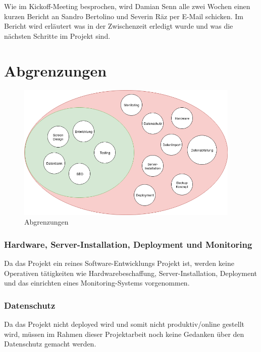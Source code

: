 Wie im Kickoff-Meeting besprochen, wird Damian Senn alle zwei Wochen einen
kurzen Bericht an Sandro Bertolino und Severin Räz per E-Mail schicken.
Im Bericht wird erläutert was in der Zwischenzeit erledigt wurde und was
die nächsten Schritte im Projekt sind.

\clearpage

\section{Abgrenzungen}\label{abgrenzungen}

\begin{figure}[!htb]
  \centering
  \includegraphics[width=0.95\textwidth]{figures/abgrenzungen.png}
  \caption{Abgrenzungen}
\end{figure}

\subsubsection{Hardware, Server-Installation, Deployment und
  Monitoring}\label{hardware-server-installation-deployment-und-monitoring}

Da das Projekt ein reines Software-Entwicklungs Projekt ist, werden
keine Operativen tätigkeiten wie Hardwarebeschaffung,
Server-Installation, Deployment und das einrichten eines
Monitoring-Systems vorgenommen.

\subsubsection{Datenschutz}\label{datenschutz}

Da das Projekt nicht deployed wird und somit nicht produktiv/online
gestellt wird, müssen im Rahmen dieser Projektarbeit noch keine Gedanken
über den Datenschutz gemacht werden.

